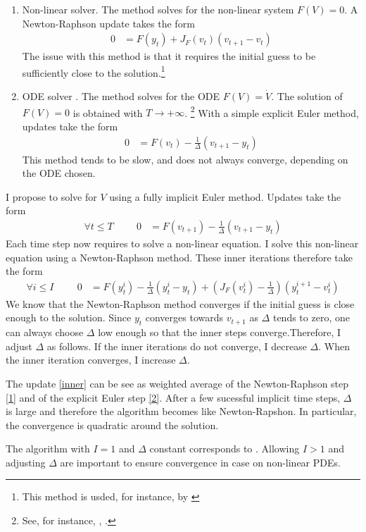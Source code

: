 \documentclass[english]{article}
\begin{document}
	\begin{enumerate}
		\item Non-linear solver. The method solves for the non-linear system $F (V ) = 0$. A Newton-Raphson update takes the form
		\begin{align}
			\label{1}
			0 &= F(y_{t}) + J_{F}(v_t) (v_{t+1} - v_t)
		\end{align}
		The issue with this method is that it requires the initial guess to be sufficiently close to the solution.\footnote{This method is usded, for instance, by \citet{garleanu2015young}}
		\item ODE solver . The method solves for the ODE $F(V) = \dot{V}$. The solution of $F(V)=0$ is obtained with $T\rightarrow +\infty$. \footnote{See, for instance, \citet{ditellabalance}, \citet{silva2015risk}.}
		With a simple explicit Euler method, updates take the form
		\begin{align}
			\label{2}
			0&= F(v_t) - \frac{1}{\Delta} (v_{t+1} -y_{t})
		\end{align}
		This method tends to be slow, and does not always converge, depending on the ODE chosen.
	\end{enumerate}
	I propose to solve for $V$ using a fully implicit Euler method.  Updates take the form 
	\begin{align*}
		\forall t \leq T \hspace{1cm} 0&= F(v_{t+1}) - \frac{1}{\Delta}(v_{t+1} -y_{t})
	\end{align*}
	Each time step now requires to solve a non-linear equation. I solve this non-linear equation using a Newton-Raphson method. These inner iterations therefore take the form
	\begin{align}
		\label{inner}
		\forall i \leq I \hspace{1cm}	0 &= F(y_{t}^i) - \frac{1}{\Delta}(y_{t}^{i} -y_{t}) + (J_{F}(v_t^i) -  \frac{1}{\Delta})(y^{i+1}_{t} - v_t^i)
	\end{align}
	We know that the Newton-Raphson method converges if the initial guess is close enough to the solution. Since $y_{t}$ converges towards $v_{t+1}$ as $\Delta$ tends to zero, one can always choose $\Delta$ low enough so that the inner steps converge.Therefore, I adjust $\Delta$ as follows. If the inner iterations do not converge, I decrease $\Delta$. When the inner iteration converges, I increase $\Delta$. \par
	The update \cref{inner} can be see as weighted average of the Newton-Raphson step \cref{1} and of the explicit Euler step \cref{2}.  After a few sucessful implicit time steps, $\Delta$ is large and therefore the algorithm becomes like Newton-Rapshon. In particular, the convergence is quadratic around the solution. \par
	The algorithm with $I=1$ and $\Delta$ constant corresponds to \citet{achdou2014heterogeneous}. Allowing $I > 1$ and adjusting $\Delta$  are important to ensure convergence in case on non-linear PDEs.




		
	
	
\end{document}
